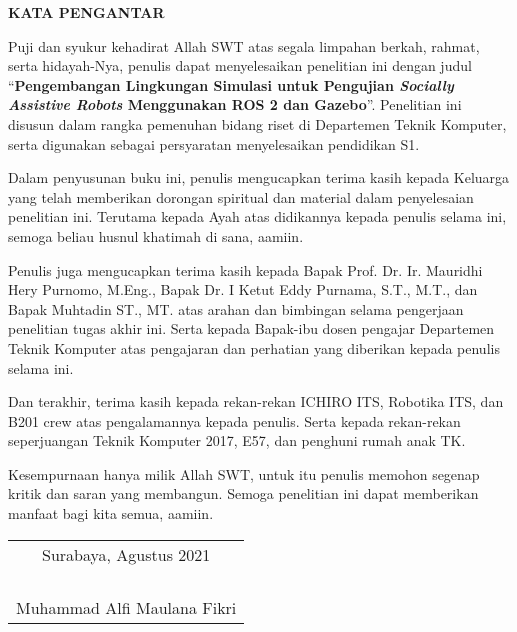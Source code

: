 \begin{center}
  \Large
  \textbf{KATA PENGANTAR}
\end{center}

\vspace{2ex}

Puji dan syukur kehadirat Allah SWT atas segala limpahan berkah, rahmat, serta hidayah-Nya, penulis  dapat menyelesaikan penelitian ini dengan judul
``\textbf{Pengembangan Lingkungan Simulasi untuk Pengujian \emph{Socially Assistive Robots} Menggunakan ROS 2 dan Gazebo}''.
Penelitian ini disusun dalam rangka pemenuhan bidang riset di Departemen Teknik Komputer,
  serta digunakan sebagai persyaratan menyelesaikan pendidikan S1.

Dalam penyusunan buku ini,
  penulis mengucapkan terima kasih kepada Keluarga yang telah memberikan dorongan spiritual dan material dalam penyelesaian penelitian ini.
Terutama kepada Ayah atas didikannya kepada penulis selama ini,
  semoga beliau husnul khatimah di sana, aamiin.

Penulis juga mengucapkan terima kasih kepada Bapak Prof. Dr. Ir. Mauridhi Hery Purnomo, M.Eng.,
  Bapak Dr. I Ketut Eddy Purnama, S.T., M.T.,
  dan Bapak Muhtadin ST., MT. atas arahan dan bimbingan selama pengerjaan penelitian tugas akhir ini.
Serta kepada Bapak-ibu dosen pengajar Departemen Teknik Komputer atas pengajaran dan perhatian yang diberikan kepada penulis selama ini.

Dan terakhir,
  terima kasih kepada rekan-rekan ICHIRO ITS, Robotika ITS, dan B201 crew atas pengalamannya kepada penulis.
Serta kepada rekan-rekan seperjuangan Teknik Komputer 2017, E57, dan penghuni rumah anak TK.

Kesempurnaan hanya milik Allah SWT, untuk itu penulis memohon segenap kritik dan saran yang  membangun.
Semoga penelitian ini dapat memberikan manfaat bagi kita semua, aamiin.

\begin{flushright}
  \begin{tabular}[b]{c}
    Surabaya, Agustus 2021\\
    \\
    \\
    \\
    \\
    Muhammad Alfi Maulana Fikri
  \end{tabular}
\end{flushright}
